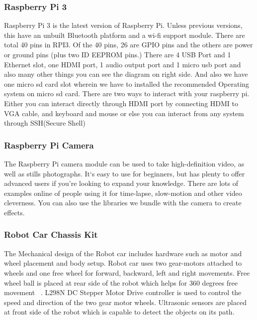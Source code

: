 \documentclass[sigconf]{acmart}
\begin{document}
\subsubsection{Raspberry Pi 3}
Raspberry Pi 3 is the latest version of Raspberry Pi. Unless previous versions, this have an unbuilt Bluetooth platform and a wi-fi support module. There are total 40 pins in RPI3. Of the 40 pins, 26 are GPIO pins and the others are power or ground pins (plus two ID EEPROM pins.) There are 4 USB Port and 1 Ethernet slot, one HDMI port, 1 audio output port and 1 micro usb port and also many other things you can see the diagram on right side. And also we have one micro sd card slot wherein we have to installed the recommended Operating system on micro sd card. There are two ways to interact with your raspberry pi. Either you can interact directly through HDMI port by connecting HDMI to VGA cable, and keyboard and mouse or else you can interact from any system through SSH(Secure Shell) ~\cite{Deligence2017} 

\subsubsection{Raspberry Pi Camera}
The Raspberry Pi camera module can be used to take high-definition video, as well as stills photographs. It`s easy to use for beginners, but has plenty to offer advanced users if you’re looking to expand your knowledge. There are lots of examples online of people using it for time-lapse, slow-motion and other video cleverness. You can also use the libraries we bundle with the camera to create effects.

\subsubsection{Robot Car Chassis Kit}
The Mechanical design of the Robot car includes hardware such as motor and wheel placement and body setup. Robot car uses two gear-motors attached to wheels and one free wheel for forward, backward, left and right movements. Free wheel ball is placed at rear side of the robot which helps for 360 degrees free movement ~\cite{arduino2015}. L298N DC Stepper Motor Drive controller is used to control the speed and direction of the two gear motor wheels. Ultrasonic sensors are placed at front side of the robot which is capable to detect the objects on its path.
\end{document}
